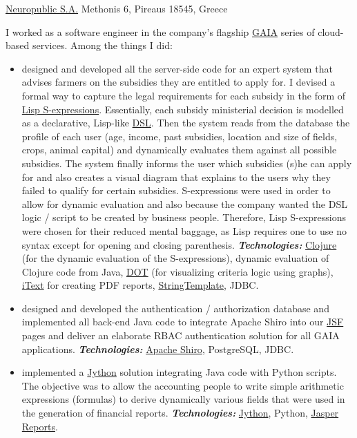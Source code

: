 \documentclass[helvetica,english,logo,notitle,totpages,utf8]{europecv2013}
\newcommand{\technologies}[0]{\textbf{\textit{Technologies:}}}
\begin{document}
\begin{europecv}
                   {\href{http://www.neuropublic.com}{Neuropublic S.A.}}
                   {Methonis 6, Pireaus 18545, Greece}
                   {
    I worked as a software engineer in the company's flagship \href{https://www.neuropublic.gr/en/component/k2/gaia-epicheirein}{GAIA} series of cloud-based services.
    Among the things I did:
    \begin{itemize}
    \item designed and developed all the server-side code for an expert system that advises farmers
      on the subsidies they are entitled to apply for. I devised a formal way to capture the legal requirements
      for each subsidy in the form of \href{https://en.wikipedia.org/wiki/S-expression}{Lisp S-expressions}.
      Essentially, each subsidy ministerial decision is
      modelled as a declarative, Lisp-like \href{https://en.wikipedia.org/wiki/Domain-specific_language}{DSL}.
      Then the system reads from the database the profile of each user (age, income, past subsidies, location
      and size of fields, crops, animal capital) and dynamically evaluates them against all possible subsidies.
      The system finally informs the user which subsidies (s)he can apply for and also creates
      a visual diagram that explains to the users why they failed to qualify for certain subsidies.
      S-expressions were used in order to allow for dynamic evaluation and also because the company wanted
      the DSL logic / script to be created by business people. Therefore, Lisp S-expressions were chosen
      for their reduced mental baggage, as Lisp requires one to use no syntax except for opening and closing parenthesis.
      \technologies{} \href{https://clojure.org/}{Clojure} (for
      the dynamic evaluation of the S-expressions), dynamic evaluation of Clojure code from Java,
      \href{https://en.wikipedia.org/wiki/DOT_(graph_description_language)}{DOT} (for visualizing
      criteria logic using graphs), \href{https://en.wikipedia.org/wiki/IText}{iText} for creating
      PDF reports, \href{http://www.stringtemplate.org/}{StringTemplate}, JDBC.
    \item designed and developed the authentication / authorization database and implemented all back-end Java
      code to integrate Apache Shiro into our \href{http://www.javaserverfaces.org/}{JSF} pages and deliver an elaborate RBAC authentication solution
      for all GAIA applications.
      \technologies{} \href{http://shiro.apache.org/}{Apache Shiro}, PostgreSQL, JDBC.
    \item implemented a \href{http://www.jython.org/}{Jython} solution integrating Java code with
      Python scripts. The objective was to
      allow the accounting people to write simple arithmetic expressions (formulas) to derive dynamically
      various fields that were used in the generation of financial reports.
      \technologies{} \href{http://www.jython.org/}{Jython}, Python, \href{http://community.jaspersoft.com/project/jasperreports-library}{Jasper Reports}.
    \end{itemize}
                   }



\end{europecv}
\end{document}
